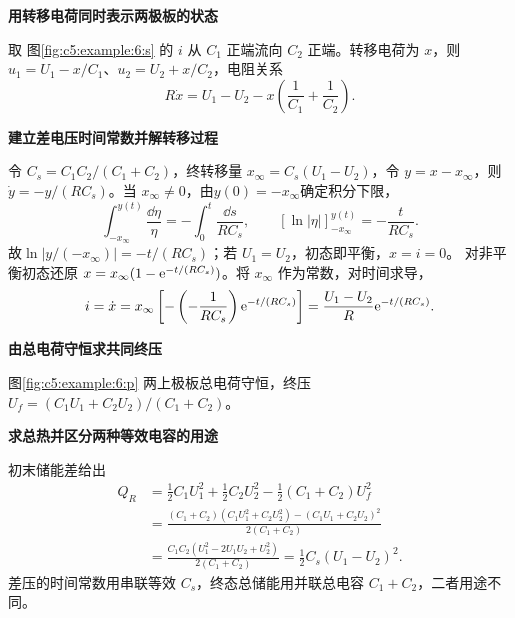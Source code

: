 \begin{solution}\textbf{用转移电荷同时表示两极板的状态}\par\nobreak
取 图\ref{fig:c5:example:6:s} 的 $i$ 从 $C_1$ 正端流向 $C_2$ 正端。转移电荷为 $x$，则 $u_1=U_1-x/C_1$、$u_2=U_2+x/C_2$，电阻关系
\[
 R\dot x=U_1-U_2-x\left(\frac1{C_1}+\frac1{C_2}\right).
\]


\par\medskip{}\noindent\textbf{建立差电压时间常数并解转移过程}\par\nobreak
令 $C_s=C_1C_2/(C_1+C_2)$，终转移量 $x_\infty=C_s(U_1-U_2)$，令 $y=x-x_\infty$，则 $\dot y=-y/(RC_s)$。当 $x_\infty\ne0$，由$y(0)=-x_\infty$确定积分下限，
\[
\int_{-x_\infty}^{y(t)}\frac{\dd \eta}{\eta}
=-\int_0^t\frac{\dd s}{RC_s},\qquad
[\ln|\eta|]_{-x_\infty}^{y(t)}=-\frac{t}{RC_s}.
\]
故$\ln|y/(-x_\infty)|=-t/(RC_s)$；若 $U_1=U_2$，初态即平衡，$x=i=0$。
对非平衡初态还原 $x=x_\infty(1-\mathrm e^{-t/(RC_s)})$。将 $x_\infty$ 作为常数，对时间求导，
\[
 i=\dot x=x_\infty\left[-\left(-\frac1{RC_s}\right)\mathrm e^{-t/(RC_s)}\right]
 =\frac{U_1-U_2}{R}\mathrm e^{-t/(RC_s)}.
\]



\par\medskip{}\noindent\textbf{由总电荷守恒求共同终压}\par\nobreak
图\ref{fig:c5:example:6:p} 两上极板总电荷守恒，终压 $U_f=(C_1U_1+C_2U_2)/(C_1+C_2)$。

\par\medskip{}\noindent\textbf{求总热并区分两种等效电容的用途}\par\nobreak
初末储能差给出
\[
 \begin{aligned}
 Q_R&=\frac12C_1U_1^2+\frac12C_2U_2^2-\frac12(C_1+C_2)U_f^2\\
 &=\frac{(C_1+C_2)(C_1U_1^2+C_2U_2^2)-(C_1U_1+C_2U_2)^2}{2(C_1+C_2)}\\
 &=\frac{C_1C_2(U_1^2-2U_1U_2+U_2^2)}{2(C_1+C_2)}
 =\frac12C_s(U_1-U_2)^2.
 \end{aligned}
\]
差压的时间常数用串联等效 $C_s$，终态总储能用并联总电容 $C_1+C_2$，二者用途不同。\end{solution}
